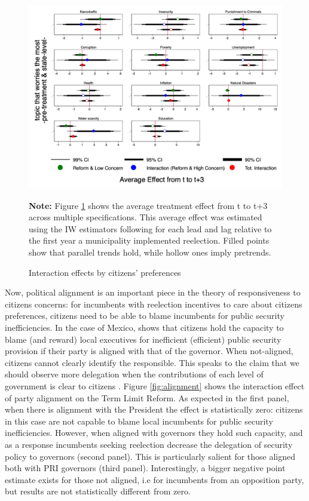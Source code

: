 \documentclass[12pt]{amsart}
\numberwithin{equation}{section}
\theoremstyle{definition}
\theoremstyle{definition}
\theoremstyle{definition}
\begin{document}
\begin{figure}[H]   
\centering
 \caption{Interaction effects by citizens' preferences}
 \label{fig:preferences_all}
\includegraphics[width=1\textwidth]{../Figures/preferences.png}
       \captionsetup{justification=centering}
       
 \textbf{Note:} Figure \ref{fig:preferences_all} shows the average treatment effect from t to t+3 across multiple specifications. This average effect was estimated using the IW estimators following \citet{abraham_sun_2020} for each lead and lag relative to the first year a municipality implemented reelection. Filled points show that parallel trends hold, while hollow ones imply pretrends.  
\end{figure} 
  
Now, political alignment is an important piece in the theory of responsiveness to citizens concerns: for incumbents with reelection incentives to care about citizens preferences, citizens need to be able to blame incumbents for public security inefficiencies. In the case of Mexico, \citet{ley_2017} shows that citizens hold the capacity to blame (and reward) local executives for inefficient (efficient) public security provision if their party is aligned with that of the governor. When not-aligned, citizens cannot clearly identify the responsible. This speaks to the claim that we should observe more delegation when the contributions of each level of government is clear to citizens \citep{treisman_2000}. Figure \ref{fig:alignment} shows the interaction effect of party alignment on the Term Limit Reform. As expected in the first panel, when there is alignment with the President the effect is statistically zero: citizens in this case are not capable to blame local incumbents for public security inefficiencies. However, when aligned with governors they hold such capacity, and as a response incumbents seeking reelection decrease the delegation of security policy to governors (second panel). This is particularly salient for those aligned both with PRI governors (third panel). Interestingly, a bigger negative point estimate exists for those not aligned, i.e for incumbents from an opposition party, but results are not statistically different from zero. 
\end{document}

